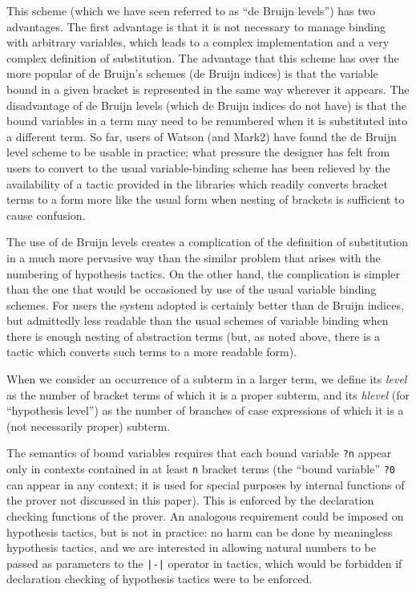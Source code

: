 \documentclass{kluwer}
\begin{document}
\begin{article}
This scheme (which we have seen referred to as ``de Bruijn levels'')
has two advantages.  The first advantage is that it is not necessary
to manage binding with arbitrary variables, which leads to a complex
implementation and a very complex definition of substitution.  The
advantage that this scheme has over the more popular of de Bruijn's
schemes (de Bruijn indices) is that the variable bound in a given
bracket is represented in the same way wherever it appears.  The
disadvantage of de Bruijn levels (which de Bruijn indices do not have)
is that the bound variables in a term may need to be renumbered when
it is substituted into a different term.  So far, users of Watson (and
Mark2) have found the de Bruijn level scheme to be usable in practice;
what pressure the designer has felt from users to convert to the usual
variable-binding scheme has been relieved by the availability of
a tactic provided in the libraries which readily converts bracket
terms to a form more like the usual form when nesting of brackets is
sufficient to cause confusion.

The use of de Bruijn levels creates a complication of the definition
of substitution in a much more pervasive way than the similar problem
that arises with the numbering of hypothesis tactics.  On the other
hand, the complication is simpler than the one that would be
occasioned by use of the usual variable binding schemes.  For users
the system adopted is certainly better than de Bruijn indices, but
admittedly less readable than the usual schemes of variable binding
when there is enough nesting of abstraction terms (but, as noted
above, there is a tactic which converts such terms to a more readable
form).

When we consider an occurrence of a subterm in a larger term, we
define its {\em level\/} as the number of bracket terms of which it is
a proper subterm, and its {\em hlevel\/} (for ``hypothesis level'') as
the number of branches of case expressions of which it is a
(not necessarily proper) subterm.

The semantics of bound variables requires that each bound variable
{\tt ?n} appear only in contexts contained in at least {\tt n} bracket
terms (the ``bound variable'' {\tt ?0} can appear in any context; it
is used for special purposes by internal functions of the prover not
discussed in this paper).  This is enforced by the declaration
checking functions of the prover.  An analogous requirement could be
imposed on hypothesis tactics, but is not in practice: no harm can be
done by meaningless hypothesis tactics, and we are interested in
allowing natural numbers to be passed as parameters to the {\tt |-|}
operator in tactics, which would be forbidden if declaration checking
of hypothesis tactics were to be enforced.


\end{article}
\end{document}
